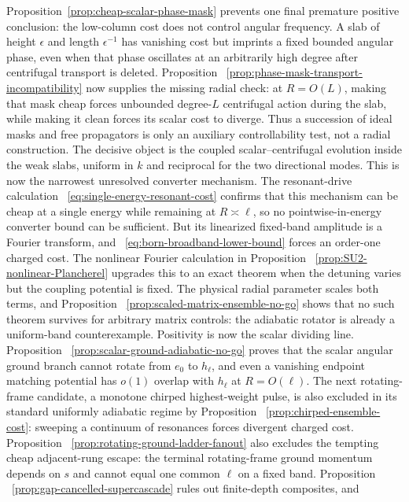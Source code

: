 \documentclass[11pt]{article}
\theoremstyle{definition}
\theoremstyle{remark}
\begin{document}
Proposition~\ref{prop:cheap-scalar-phase-mask} prevents one final premature
positive conclusion: the low-column cost does not control angular frequency.
A slab of height $\epsilon$ and length $\epsilon^{-1}$ has vanishing cost but
imprints a fixed bounded angular phase, even when that phase oscillates at an
arbitrarily high degree after centrifugal transport is deleted.  Proposition
~\ref{prop:phase-mask-transport-incompatibility} now supplies the missing radial
check: at $R=O(L)$, making that mask cheap forces unbounded degree-$L$
centrifugal action during the slab, while making it clean forces its scalar
cost to diverge.  Thus a succession of ideal masks and free propagators is only
an auxiliary controllability test, not a radial construction.  The decisive
object is the coupled scalar--centrifugal evolution inside the weak slabs,
uniform in $k$ and reciprocal for the two directional modes.  This is now the
narrowest unresolved converter mechanism.  The resonant-drive calculation
~\eqref{eq:single-energy-resonant-cost} confirms that this mechanism can be
 cheap at a single energy while remaining at $R\asymp\ell$, so no
 pointwise-in-energy converter bound can be sufficient.  But its linearized fixed-band
 amplitude is a Fourier transform, and
 ~\eqref{eq:born-broadband-lower-bound} forces an order-one charged cost.  The
 nonlinear Fourier calculation in Proposition
 ~\ref{prop:SU2-nonlinear-Plancherel} upgrades this to an exact theorem when the
 detuning varies but the coupling potential is fixed.  The physical radial
 parameter scales both terms, and Proposition
 ~\ref{prop:scaled-matrix-ensemble-no-go} shows that no such theorem survives
 for arbitrary matrix controls: the adiabatic rotator is already a uniform-band
 counterexample.  Positivity is now the scalar dividing line.  Proposition
 ~\ref{prop:scalar-ground-adiabatic-no-go} proves that the scalar angular ground
 branch cannot rotate from $e_0$ to $h_\ell$, and even a vanishing endpoint
 matching potential has $o(1)$ overlap with $h_\ell$ at $R=O(\ell)$.  The next
 rotating-frame candidate, a monotone chirped highest-weight pulse, is also
 excluded in its standard uniformly adiabatic regime by Proposition
 ~\ref{prop:chirped-ensemble-cost}: sweeping a continuum of resonances forces
 divergent charged cost.  Proposition
 ~\ref{prop:rotating-ground-ladder-fanout} also excludes the tempting cheap
 adjacent-rung escape: the terminal rotating-frame ground momentum depends on
 $s$ and cannot equal one common $\ell$ on a fixed band.  Proposition
 ~\ref{prop:gap-cancelled-supercascade} rules out finite-depth composites, and
\end{document}
